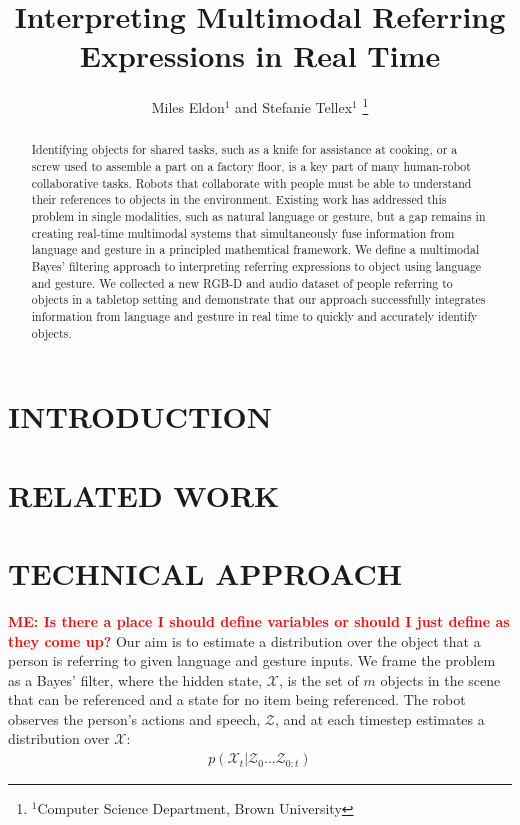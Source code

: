 \documentclass[letterpaper, 10 pt, conference]{ieeeconf}
\title{\LARGE \bf
Interpreting Multimodal Referring Expressions in Real Time}
\author{Miles Eldon$^{1}$ and Stefanie Tellex$^{1}$
\thanks{$^{1}$Computer Science Department, Brown University}
}
\newcommand{\menote}[1]{\textcolor{Red}{\textbf{ME: #1}}}
\begin{document}
\maketitle
\thispagestyle{empty}
\pagestyle{empty}

\begin{abstract}
Identifying objects for shared tasks, such as a knife for assistance
at cooking, or a screw used to assemble a part on a factory floor, is
a key part of many human-robot collaborative tasks.  Robots that
collaborate with people must be able to understand their references to
objects in the environment.  Existing work has addressed this problem
in single modalities, such as natural language or gesture, but a gap
remains in creating real-time multimodal systems that simultaneously
fuse information from language and gesture in a principled mathemtical
framework.  We define a multimodal Bayes' filtering approach to
interpreting referring expressions to object using language and
gesture.  We collected a new RGB-D and audio dataset of people
referring to objects in a tabletop setting and demonstrate that our
approach successfully integrates information from language and gesture
in real time to quickly and accurately identify objects.
\end{abstract}

\section{INTRODUCTION}

\section{RELATED WORK}


\citep{matuszek12}

\section{TECHNICAL APPROACH}
\menote{Is there a place I should define variables or should I just define as they come up?}
Our aim is to estimate a distribution over the object that a person is
referring to given language and gesture inputs.  We frame the problem
as a Bayes' filter, where the hidden state, $\mathcal{X}$, is the set
of $m$ objects in the scene that can be referenced and a state for no
item being referenced.  The robot observes the person's actions and
speech, $\mathcal{Z}$, and at each timestep estimates a distribution
over $\mathcal{X}$:
\begin{align}
  p(\mathcal{X}_t | \mathcal{Z}_0 \dots \mathcal{Z}_{0:t})
\end{align}
\end{document}
